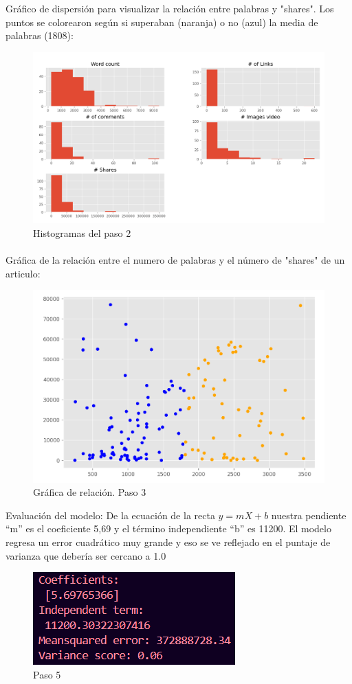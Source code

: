 \documentclass{article}
\begin{document}
Gráfico de dispersión para visualizar la relación entre palabras y "shares". Los puntos se colorearon según si superaban (naranja) o no (azul) la media de palabras (1808):
\begin{figure}[h]
    \centering
    \includegraphics[width=0.9\linewidth]{img/a9_graficas.png}
    \caption{Histogramas del paso 2}
    \label{fig:figure2}
\end{figure}

\paragraph{}Gráfica de la relación entre el numero de palabras y el número de "shares" de un articulo:
\begin{figure}[H]
    \centering
    \includegraphics[width=0.5\linewidth]{img/a9_relacion.png}
    \caption{Gráfica de relación. Paso 3}
    \label{fig:figure2}
\end{figure}

Evaluación del modelo: De la ecuación de la recta $y=mX+b$ nuestra pendiente “m” es el coeficiente 5,69 y el término independiente “b” es 11200. El modelo regresa un error cuadrático muy grande y eso se ve reflejado en el puntaje de varianza que debería ser cercano a 1.0
\begin{figure}[H]
    \centering
    \includegraphics[width=0.4\linewidth]{img/a9_ecuacion.png}
    \caption{Paso 5}
    \label{fig:figure2}
\end{figure}
\end{document}
